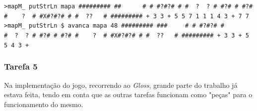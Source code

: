 \documentclass[a4paper]{article}
\begin{document}
    \texttt{>mapM\_ putStrLn  mapa
        \linebreak \#\#\#\#\#\#\#\#\#
        \linebreak \#\#\ \  \ \ \ \ \#
        \linebreak \# \#?\#?\# \#
        \linebreak \#\ \ ?\ \ ?\ \#
        \linebreak \#?\# \# \#?\#
        \linebreak \#\ \ \ \ ?\ \ \#
        \linebreak \#X\#?\#?\# \#
        \linebreak \# \ ??\ \ \ \#
        \linebreak \#\#\#\#\#\#\#\#\#
        \linebreak + 3 3
        \linebreak + 5 5
         7 1 1 1
         4 3 +
         7 7 
        \linebreak 
        \linebreak
        >mapM\_ putStrLn \$ avanca mapa 48
        \linebreak \#\#\#\#\#\#\#\#\#
        \linebreak \#\#\#\  \ \ \ \ \#
        \linebreak \# \#?\#?\# \#
        \linebreak \#\ \ ?\ \ ?\ \#
        \linebreak \#?\# \# \#?\#
        \linebreak \#\ \ \ \ ?\ \ \#
        \linebreak \#X\#?\#?\# \#
        \linebreak \# \ ??\ \ \ \#
        \linebreak \#\#\#\#\#\#\#\#\#
        \linebreak + 3 3
        \linebreak + 5 5
         4 3 + } 
    
\pagebreak

\subsubsection{Tarefa 5}
\hspace{0.54cm}Na implementação do jogo, recorrendo ao \emph{Gloss}, grande parte do trabalho já estava feita, tendo em conta 
    que as outras tarefas funcionam como "peças" para o funcionamento do mesmo. 
    
\end{document}
